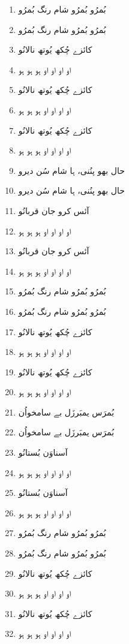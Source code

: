 \documentclass[12pt]{article}
\newcommand{\bigarabic}[1]{\fontsize{16pt}{18pt}\selectfont \textarabic{#1}}
\begin{document}
\begin{multicols}{2}
\begin{multicols}{2}
\columnbreak

\begin{RTL}
\begin{enumerate}[leftmargin=*, label=\arabic*., font=\fontsize{16pt}{18pt}\selectfont]
  \item \bigarabic{بُمرُو بُمرُو شام رنگ بُمرُو}
  \item \bigarabic{بُمرُو بُمرُو شام رنگ بُمرُو}
  \item \bigarabic{کائزے چُکھ یُوتھ نالانُو}
  \item \bigarabic{او او او او ہو ہو ہو}
  \item \bigarabic{کائزے چُکھ یُوتھ نالانُو}
  \item \bigarabic{او او او او ہو ہو ہو}
  \item \bigarabic{کائزے چُکھ یُوتھ نالانُو}
  \item \bigarabic{او او او او ہو ہو ہو}
  \item \bigarabic{حال بھو پنُنی، ہا شام سُن دیرو}
  \item \bigarabic{حال بھو پنُنی، ہا شام سُن دیرو}
  \item \bigarabic{آئس کرو جان قربانُو}
  \item \bigarabic{او او او او ہو ہو ہو}
  \item \bigarabic{آئس کرو جان قربانُو}
  \item \bigarabic{او او او او ہو ہو ہو}
  \item \bigarabic{بُمرُو بُمرُو شام رنگ بُمرُو}
  \item \bigarabic{بُمرُو بُمرُو شام رنگ بُمرُو}
  \item \bigarabic{کائزے چُکھ یُوتھ نالانُو}
  \item \bigarabic{او او او او ہو ہو ہو}
  \item \bigarabic{کائزے چُکھ یُوتھ نالانُو}
  \item \bigarabic{او او او او ہو ہو ہو}
  \item \bigarabic{بُمرَس یمبَرزَل بے سامخواُن}
  \item \bigarabic{بُمرَس یمبَرزَل بے سامخواُن}
  \item \bigarabic{آسناوَن بُستانُو}
  \item \bigarabic{او او او او ہو ہو ہو}
  \item \bigarabic{آسناوَن بُستانُو}
  \item \bigarabic{او او او او ہو ہو ہو}
  \item \bigarabic{بُمرُو بُمرُو شام رنگ بُمرُو}
  \item \bigarabic{بُمرُو بُمرُو شام رنگ بُمرُو}
  \item \bigarabic{کائزے چُکھ یُوتھ نالانُو}
  \item \bigarabic{او او او او ہو ہو ہو}
  \item \bigarabic{کائزے چُکھ یُوتھ نالانُو}
  \item \bigarabic{او او او او ہو ہو ہو}
\end{enumerate}
\end{RTL}
\end{multicols}


\end{multicols}
\end{document}
